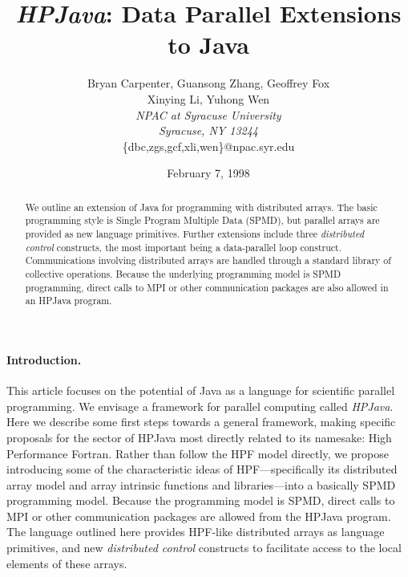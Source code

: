 






\pagestyle{plain}

\title{{\em HPJava}: Data Parallel Extensions to Java}

\author{Bryan Carpenter, Guansong Zhang, Geoffrey Fox \\
        Xinying Li, Yuhong Wen\vspace{5mm} \\
        {\em NPAC at Syracuse University} \\
        {\em Syracuse, NY 13244} \\
        \{dbc,zgs,gcf,xli,wen\}@npac.syr.edu}

\date{February 7, 1998}

\maketitle

\begin{abstract}
We outline an extension of Java for programming
with distributed arrays.  The basic programming style is Single Program
Multiple Data (SPMD), but parallel arrays are provided as new language
primitives.  Further extensions include three {\em distributed control}
constructs, the most important being a data-parallel loop construct.
Communications involving distributed arrays are handled through a
standard library of collective operations.  Because the underlying
programming model is SPMD programming, direct calls to MPI or other
communication packages are also allowed in an HPJava program.
\end{abstract}

\paragraph{Introduction.}

This article focuses on the potential of Java as a language for
scientific parallel programming.  We envisage a framework for parallel
computing called {\em HPJava}.  Here we describe some first steps
towards a general framework, making specific proposals
for the sector of HPJava most directly related to its namesake: High
Performance Fortran.  Rather than follow the HPF model directly, we
propose introducing some of the characteristic ideas of
HPF---specifically its distributed array model and array intrinsic
functions and libraries---into a basically SPMD programming model.
Because the programming model is SPMD, direct calls to MPI or other
communication packages are allowed from the HPJava program.  The
language outlined here provides HPF-like distributed arrays as language
primitives, and new {\em distributed control} constructs to facilitate
access to the local elements of these arrays.

